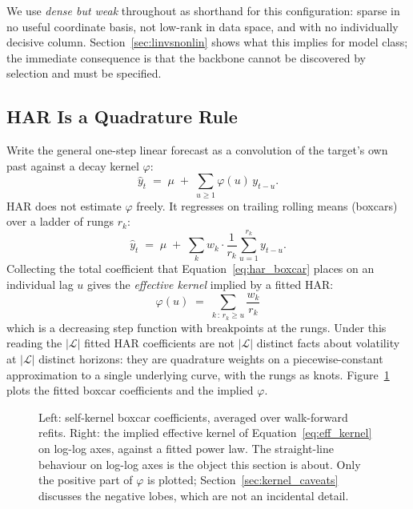 We use \emph{dense but weak} throughout as shorthand for this configuration:
sparse in no useful coordinate basis, not low-rank in data space, and with no
individually decisive column. Section~\ref{sec:linvsnonlin} shows what this
implies for model class; the immediate consequence is that the backbone cannot
be discovered by selection and must be specified.

\subsection{HAR Is a Quadrature Rule}
\label{sec:har_quadrature}

Write the general one-step linear forecast as a convolution of the target's own
past against a decay kernel $\varphi$:
\begin{equation}
  \hat{y}_t \;=\; \mu \;+\; \sum_{u \ge 1} \varphi(u)\, y_{t-u}.
  \label{eq:convolution}
\end{equation}
HAR does not estimate $\varphi$ freely. It regresses on trailing rolling means
(boxcars) over a ladder of rungs $r_k$:
\begin{equation}
  \hat{y}_t \;=\; \mu \;+\; \sum_{k} w_k \cdot \frac{1}{r_k}\sum_{u=1}^{r_k} y_{t-u}.
  \label{eq:har_boxcar}
\end{equation}
Collecting the total coefficient that Equation~\eqref{eq:har_boxcar} places on
an individual lag $u$ gives the \emph{effective kernel} implied by a fitted HAR:
\begin{equation}
  \boxed{\;\varphi(u) \;=\; \sum_{k \,:\, r_k \ge u} \frac{w_k}{r_k}\;}
  \label{eq:eff_kernel}
\end{equation}
which is a decreasing step function with breakpoints at the rungs. Under this
reading the $|\mathcal{L}|$ fitted HAR coefficients are not $|\mathcal{L}|$
distinct facts about volatility at $|\mathcal{L}|$ distinct horizons: they are
quadrature weights on a piecewise-constant approximation to a single underlying
curve, with the rungs as knots. Figure~\ref{fig:target_kernel} plots the fitted
boxcar coefficients and the implied $\varphi$.

\begin{figure}[H]
\centering
{}
\caption{Left: self-kernel boxcar coefficients, averaged over walk-forward
refits. Right: the implied effective kernel of Equation~\eqref{eq:eff_kernel}
on log-log axes, against a fitted power law. The straight-line behaviour on
log-log axes is the object this section is about. Only the positive part of
$\varphi$ is plotted; Section~\ref{sec:kernel_caveats} discusses the negative
lobes, which are not an incidental detail.}
\label{fig:target_kernel}
\end{figure}

